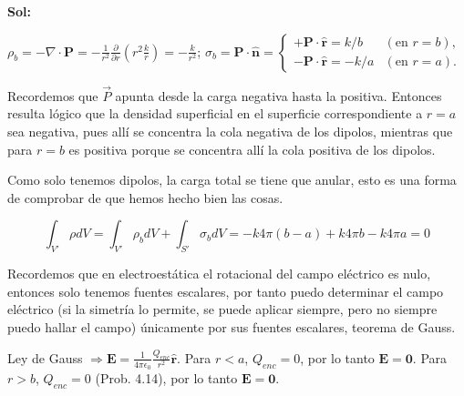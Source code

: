 \documentclass[12pt,a4paper]{report}
\newcommand{\esp}{\vspace{0.5cm}}
\begin{document}
	\noindent \textbf{Sol:}
	
	\esp
	
	$\rho_b = -\nabla \cdot \mathbf{P} = -\frac{1}{r^2} \frac{\partial}{\partial r} \left( r^2 \frac{k}{r} \right) = -\frac{k}{r^2}$; \quad $\sigma_b = \mathbf{P} \cdot \hat{\mathbf{n}} = \begin{cases} +\mathbf{P} \cdot \hat{\mathbf{r}} = k/b & (\text{en } r = b), \\ -\mathbf{P} \cdot \hat{\mathbf{r}} = -k/a & (\text{en } r = a). \end{cases}$
	
	\esp
	
	\begin{nota}
		Recordemos que $\vec{P}$ apunta desde la carga negativa hasta la positiva. Entonces resulta lógico que la densidad superficial en el superficie correspondiente a $r=a$ sea negativa, pues allí se concentra la cola negativa de los dipolos, mientras que para $r=b$ es positiva porque se concentra allí la cola positiva de los dipolos.
	\end{nota}
	
	\esp
	
	\begin{nota}
		Como solo tenemos dipolos, la carga total se tiene que anular, esto es una forma de comprobar de que hemos hecho bien las cosas. 
		
		\begin{equation*}
			\int_{V'} \rho dV = \int_{V'} \rho_b dV + \int_{S'} \sigma_b dV = -k4\pi(b-a) + k4\pi b - k4\pi a = 0
		\end{equation*}
	\end{nota}
	
	\esp
	
	\begin{nota}
		Recordemos que en electroestática el rotacional del campo eléctrico es nulo, entonces solo tenemos fuentes escalares, por tanto puedo determinar el campo eléctrico (si la simetría lo permite, se puede aplicar siempre, pero no siempre puedo hallar el campo) únicamente por sus fuentes escalares, teorema de Gauss.
	\end{nota}
	
	\esp
	
	Ley de Gauss $\Rightarrow \mathbf{E} = \frac{1}{4\pi\epsilon_0} \frac{Q_{enc}}{r^2} \hat{\mathbf{r}}$. Para $r < a$, $Q_{enc} = 0$, por lo tanto $\mathbf{E} = \mathbf{0}$. Para $r > b$, $Q_{enc} = 0$ (Prob. 4.14), por lo tanto $\mathbf{E} = \mathbf{0}$.
	
	\esp
	
\end{document}
